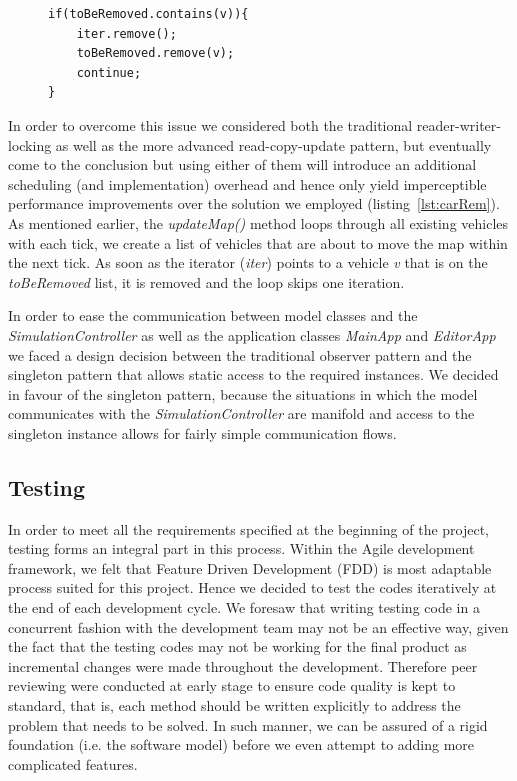 \begin{figure}
	\begin{minipage}{0.45\textwidth}
		\begin{lstlisting}[caption={Car Removal}, label={lst:carRem}]
if(toBeRemoved.contains(v)){
	iter.remove();
	toBeRemoved.remove(v);
	continue;
}	
		\end{lstlisting}
	\end{minipage}
\end{figure}

In order to overcome this issue we considered both the traditional reader-writer-locking as well as the more advanced read-copy-update pattern, but eventually come to the conclusion but using either of them will introduce an additional scheduling (and implementation) overhead and hence only yield imperceptible performance improvements over the solution we employed (listing~\ref{lst:carRem}). As mentioned earlier, the \textit{updateMap()} method loops through all existing vehicles with each tick, we create a list of vehicles that are about to move the map within the next tick. As soon as the iterator (\textit{iter}) points to a vehicle \textit{v} that is on the \textit{toBeRemoved} list, it is removed and the loop skips one iteration.  

In order to ease the communication between model classes and the \textit{SimulationController} as well as the application classes \textit{MainApp} and \textit{EditorApp} we faced a design decision between the traditional observer pattern and the singleton pattern that allows static access to the required instances. We decided in favour of the singleton pattern, because the situations in which the model communicates with the \textit{SimulationController} are manifold and access to the singleton instance allows for fairly simple communication flows.



\subsection{Testing}
In order to meet all the requirements specified at the beginning of the project, testing forms an integral part in this process. Within the Agile development framework, we felt that Feature Driven Development (FDD) is most adaptable process suited for this project. Hence we decided to test the codes iteratively at the end of each development cycle. We foresaw that writing testing code in a concurrent fashion with the development team may not be an effective way, given the fact that the testing codes may not be working for the final product as incremental changes were made throughout the development. Therefore peer reviewing were conducted at early stage to ensure  code quality is kept to standard, that is, each method should be written explicitly to address the problem that needs to be solved. In such manner, we can be assured of a rigid foundation (i.e. the software model) before we even attempt to adding more complicated features.

